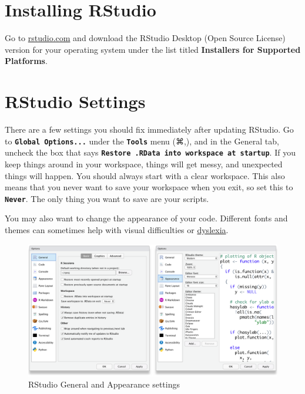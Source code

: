 \documentclass[
  oneside]{book}
\begin{document}
\hypertarget{installing-rstudio}{%
\section{Installing RStudio}\label{installing-rstudio}}

Go to \href{https://www.rstudio.com/products/rstudio/download/\#download}{rstudio.com} and download the RStudio Desktop (Open Source License) version for your operating system under the list titled \textbf{Installers for Supported Platforms}.

\hypertarget{rstudio-settings}{%
\section{RStudio Settings}\label{rstudio-settings}}

There are a few settings you should fix immediately after updating RStudio. Go to \textbf{\texttt{Global\ Options...}} under the \textbf{\texttt{Tools}} menu (⌘,), and in the General tab, uncheck the box that says \textbf{\texttt{Restore\ .RData\ into\ workspace\ at\ startup}}. If you keep things around in your workspace, things will get messy, and unexpected things will happen. You should always start with a clear workspace. This also means that you never want to save your workspace when you exit, so set this to \textbf{\texttt{Never}}. The only thing you want to save are your scripts.

You may also want to change the appearance of your code. Different fonts and themes can sometimes help with visual difficulties or \href{https://datacarpentry.org/blog/2017/09/coding-and-dyslexia}{dyslexia}.

\begin{figure}

{\centering \includegraphics[width=1\linewidth]{images/rstudio_settings_general_appearance} 

}

\caption{RStudio General and Appearance settings}\label{fig:settings-general}
\end{figure}
\end{document}
